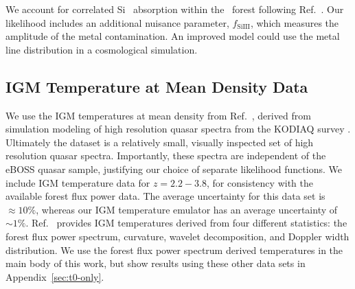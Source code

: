 We account for correlated Si~{} absorption within the \lya~forest following Ref.~\cite{2006ApJS..163...80M}.
Our likelihood includes an additional nuisance parameter, $f_\mathrm{SiIII}$, which measures the amplitude of the metal contamination. An improved model could use the metal line distribution in a cosmological simulation.

\subsection{IGM Temperature at Mean Density Data}\label{sec:t0data}

We use the IGM temperatures at mean density from Ref.~\cite{2021MNRAS.506.4389G}, derived from simulation modeling of high resolution quasar spectra from the KODIAQ survey \cite{2017AJ....154..114O}.
Ultimately the dataset is a relatively small, visually inspected set of high resolution quasar spectra.
Importantly, these spectra are independent of the eBOSS quasar sample, justifying our choice of separate likelihood functions.
We include IGM temperature data for $z=2.2-3.8$, for consistency with the available \lya forest flux power data.
The average uncertainty for this data set is $\approx10\%$, whereas our IGM temperature emulator has an average uncertainty of $\sim 1\%$.
Ref.~\cite{2021MNRAS.506.4389G} provides IGM temperatures derived from four different statistics: the \lya forest flux power spectrum, curvature, wavelet decomposition, and Doppler width distribution.
We use the \lya forest flux power spectrum derived temperatures in the main body of this work, but show results using these other data sets in Appendix~\ref{sec:t0-only}.

